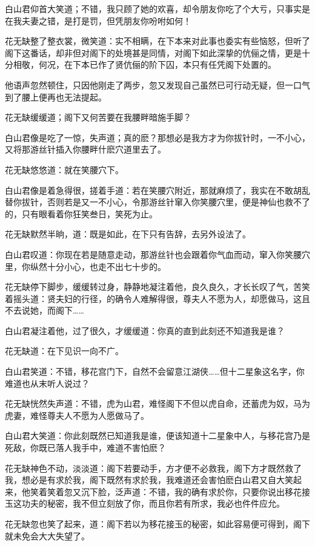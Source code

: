 \documentclass[12pt,oneside]{book}
\begin{document}
白山君仰首大笑道；不错，我只顾了她的欢喜，却令朋友你吃了个大亏，只事实是在我夫妻之错，是打是罚，但凭朋友你吩咐如何！

花无缺整了整衣裳，微笑道：实不相瞒，在下本来对此事也委实有些恼怒，但听了阁下这番话，却非但对阁下的处境甚是同情，对阁下如此深挚的伉俪之情，更是十分相敬，何况，在下本已作了贤伉俪的阶下囚，本只有任凭阁下处置的。

他语声忽然顿住，只因他刚走了两步，忽又发现自己虽然已可行动无疑，但一口气到了腰上便再也无法提起。

花无缺缓缓道；阁下又何苦要在我腰畔暗施手脚？

白山君像是吃了一惊，失声道；真的麽？那想必是我方才为你拔针时，一不小心，又将那游丝针插入你腰畔什麽穴道里去了。

花无缺悠悠道：就在笑腰穴下。

白山君像是着急得很，搓着手道：若在笑腰穴附近，那就麻烦了，我实在不敢胡乱替你拔针，否则若是又一不小心，令那游丝针窜入你笑腰穴里，便是神仙也救不了的，只有眼看着你狂笑叁日，笑死为止。

花无缺默然半晌，道：既是如此，在下只有告辞，去另外设法了。

白山君叹道：你现在若是随意走动，那游丝针也会跟着你气血而动，窜入你笑腰穴里，你纵然十分小心，也走不出七十步的。

花无缺停下脚步，缓缓转过身，静静地凝注着他，良久良久，才长长叹了气，苦笑着摇头道：贤夫妇的行径，的确令人难解得很，尊夫人不愿为人，却愿做马，这且不去说她，而阁下\ldots\ldots{}

白山君凝注着他，过了很久，才缓缓道：你真的直到此刻还不知道我是谁？

花无缺道：在下见识一向不广。

白山君笑道：不错，移花宫门下，自然不会留意江湖侠\ldots\ldots 但十二星象这名字，你难道也从末听人说过？

花无缺恍然失声道：不错，虎为山君，难怪阁下不但以虎自命，还蓄虎为奴，马为虎妻，难怪尊夫人不愿为人愿做马了。

白山君大笑道：你此刻既然已知道我是谁，便该知道十二星象中人，与移花宫乃是死敌，你既已落人我手中，难道不害怕麽？

花无缺神色不动，淡淡道：阁下若要动手，方才便不必救我，阁下方才既然救了我，想必是有求於我，阁下既然有求於我，我难道还会害怕麽白山君又自大笑起来，他笑着笑着忽又沉下脸，泛声道：不错，我的确有求於你，只要你说出移花接玉这功夫的秘密，我不但立刻放了你，而且你若有所求，我必也件件应允。

花无缺忽也笑了起来，道：阁下若以为移花接玉的秘密，如此容易便可得到，阁下就未免会大大失望了。
\end{document}
